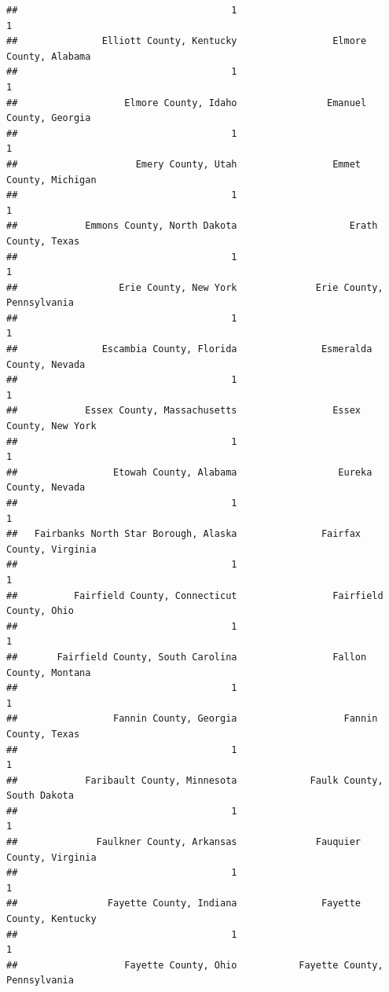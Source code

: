 \documentclass[
]{article}
\begin{document}
\begin{verbatim}
##                                      1                                      1 
##               Elliott County, Kentucky                 Elmore County, Alabama 
##                                      1                                      1 
##                   Elmore County, Idaho                Emanuel County, Georgia 
##                                      1                                      1 
##                     Emery County, Utah                 Emmet County, Michigan 
##                                      1                                      1 
##            Emmons County, North Dakota                    Erath County, Texas 
##                                      1                                      1 
##                  Erie County, New York              Erie County, Pennsylvania 
##                                      1                                      1 
##               Escambia County, Florida               Esmeralda County, Nevada 
##                                      1                                      1 
##            Essex County, Massachusetts                 Essex County, New York 
##                                      1                                      1 
##                 Etowah County, Alabama                  Eureka County, Nevada 
##                                      1                                      1 
##   Fairbanks North Star Borough, Alaska               Fairfax County, Virginia 
##                                      1                                      1 
##          Fairfield County, Connecticut                 Fairfield County, Ohio 
##                                      1                                      1 
##       Fairfield County, South Carolina                 Fallon County, Montana 
##                                      1                                      1 
##                 Fannin County, Georgia                   Fannin County, Texas 
##                                      1                                      1 
##            Faribault County, Minnesota             Faulk County, South Dakota 
##                                      1                                      1 
##              Faulkner County, Arkansas              Fauquier County, Virginia 
##                                      1                                      1 
##                Fayette County, Indiana               Fayette County, Kentucky 
##                                      1                                      1 
##                   Fayette County, Ohio           Fayette County, Pennsylvania 

\end{verbatim}
\end{document}
